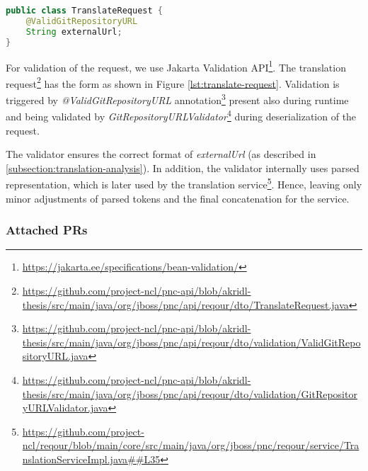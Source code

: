 \documentclass[../main.tex]{subfiles}
\begin{document}
\begin{lstlisting}[language=Java, caption=Translate request, label={lst:translate-request}, numbers=none]
public class TranslateRequest {
    @ValidGitRepositoryURL
    String externalUrl;
}
\end{lstlisting}

For validation of the request, we use Jakarta Validation API\footnote{\url{https://jakarta.ee/specifications/bean-validation/}}. The translation request\footnote{\url{https://github.com/project-ncl/pnc-api/blob/akridl-thesis/src/main/java/org/jboss/pnc/api/reqour/dto/TranslateRequest.java}} has the form as shown in Figure \ref{lst:translate-request}. Validation is triggered by \textit{@ValidGitRepositoryURL} annotation\footnote{\url{https://github.com/project-ncl/pnc-api/blob/akridl-thesis/src/main/java/org/jboss/pnc/api/reqour/dto/validation/ValidGitRepositoryURL.java}} present also during runtime and being validated by \textit{GitRepositoryURLValidator}\footnote{\url{https://github.com/project-ncl/pnc-api/blob/akridl-thesis/src/main/java/org/jboss/pnc/api/reqour/dto/validation/GitRepositoryURLValidator.java}} during deserialization of the request.

The validator ensures the correct format of \textit{externalUrl} (as described in \ref{subsection:translation-analysis}). In addition, the validator internally uses parsed representation, which is later used by the translation service\footnote{\url{https://github.com/project-ncl/reqour/blob/main/core/src/main/java/org/jboss/pnc/reqour/service/TranslationServiceImpl.java##L35}}. Hence, leaving only minor adjustments of parsed tokens and the final concatenation for the service.

\subsubsection*{Attached PRs}

\end{document}
